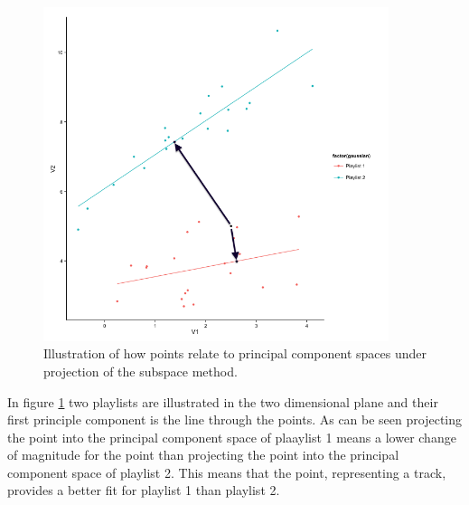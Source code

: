 \documentclass[a4paper,11pt]{kth-mag}
\begin{document}
\begin{figure}
\centering
\includegraphics[width=0.9\textwidth]{images/subspaceIllustrationBW0.png}
\caption{Illustration of how points relate to principal component spaces under projection of the subspace method.}
\label{subsIll}
\end{figure}


In figure \ref{subsIll} two playlists are illustrated in the two dimensional plane and their first principle component is the line through the points. As can be seen projecting the point into the principal component space of plaaylist 1 means a lower change of magnitude for the point than projecting the point into the principal component space of playlist 2. This means that the point, representing a track, provides a better fit for playlist 1 than playlist 2.
\end{document}
